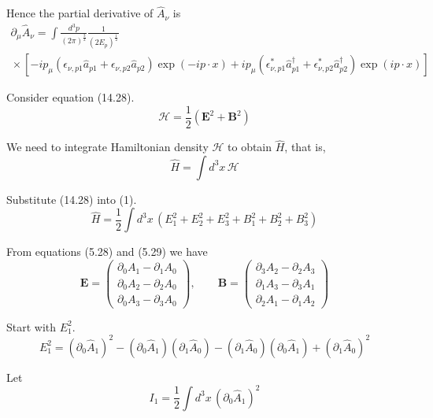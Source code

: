 Hence the partial derivative of $\hat A_\nu$ is
\begin{multline*}
\partial_\mu\hat A_\nu=\int\frac{d^3p}{(2\pi)^\frac{3}{2}}\frac{1}{(2E_p)^\frac{1}{2}}
\\
{}\times
\left[
-ip_\mu(\epsilon_{\nu,p1}\hat a_{p1}+\epsilon_{\nu,p2}\hat a_{p2})\exp(-ip\cdot x)
+ip_\mu(\epsilon_{\nu,p1}^*\hat a_{p1}^\dag+\epsilon_{\nu,p2}^*\hat a_{p2}^\dag)\exp(ip\cdot x)
\right]
\end{multline*}

Consider equation (14.28).
\begin{equation*}
\mathcal H=\frac{1}{2}(\mathbf E^2+\mathbf B^2)
\tag{14.28}
\end{equation*}

We need to integrate Hamiltonian density $\mathcal H$ to obtain $\hat H$, that is,
\begin{equation*}
\hat H=\int d^3x\,\mathcal H
\tag{1}
\end{equation*}

Substitute (14.28) into (1).
\begin{equation*}
\hat H=\frac{1}{2}\int d^3x\,\left(E_1^2+E_2^2+E_3^2+B_1^2+B_2^2+B_3^2\right)
\end{equation*}

From equations (5.28) and (5.29) we have
\begin{equation*}
\mathbf E=\begin{pmatrix}
\partial_0A_1-\partial_1A_0
\\
\partial_0A_2-\partial_2A_0
\\
\partial_0A_3-\partial_3A_0
\end{pmatrix},
\qquad
\mathbf B=\begin{pmatrix}
\partial_3A_2-\partial_2A_3
\\
\partial_1A_3-\partial_3A_1
\\
\partial_2A_1-\partial_1A_2
\end{pmatrix}
\end{equation*}

Start with $E_1^2$.
\begin{equation*}
E_1^2=(\partial_0\hat A_1)^2
-(\partial_0\hat A_1)(\partial_1\hat A_0)
-(\partial_1\hat A_0)(\partial_0\hat A_1)
+(\partial_1\hat A_0)^2
\end{equation*}

Let
\begin{equation*}
I_1=\frac{1}{2}\int d^3x\,(\partial_0\hat A_1)^2
\end{equation*}


